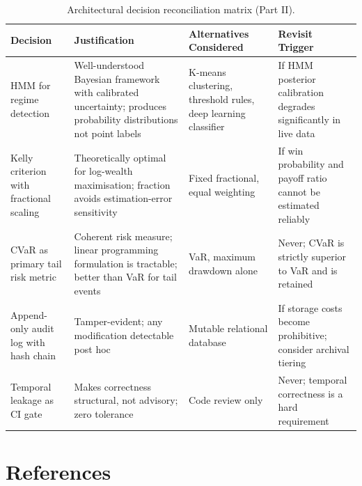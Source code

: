 \documentclass[12pt,openany]{book}
\numberwithin{equation}{chapter}
\theoremstyle{plain}
\theoremstyle{definition}
\theoremstyle{remark}
\begin{document}
\begin{table}[H]
\centering
\caption{Architectural decision reconciliation matrix (Part II).}
\label{tab:decisions_2}
\small
\begin{tabularx}{\textwidth}{p{3.5cm} p{4.5cm} p{3.5cm} p{3.0cm}}
\toprule
\textbf{Decision} & \textbf{Justification} & \textbf{Alternatives Considered} & \textbf{Revisit Trigger} \\
\midrule
HMM for regime detection &
    Well-understood Bayesian framework with calibrated uncertainty;
    produces probability distributions not point labels &
    K-means clustering, threshold rules, deep learning classifier &
    If HMM posterior calibration degrades significantly in live data \\
\midrule
Kelly criterion with fractional scaling &
    Theoretically optimal for log-wealth maximisation; fraction avoids
    estimation-error sensitivity &
    Fixed fractional, equal weighting &
    If win probability and payoff ratio cannot be estimated reliably \\
\midrule
CVaR as primary tail risk metric &
    Coherent risk measure; linear programming formulation is tractable;
    better than VaR for tail events &
    VaR, maximum drawdown alone &
    Never; CVaR is strictly superior to VaR and is retained \\
\midrule
Append-only audit log with hash chain &
    Tamper-evident; any modification detectable post hoc &
    Mutable relational database &
    If storage costs become prohibitive; consider archival tiering \\
\midrule
Temporal leakage as CI gate &
    Makes correctness structural, not advisory; zero tolerance &
    Code review only &
    Never; temporal correctness is a hard requirement \\
\bottomrule
\end{tabularx}
\end{table}



\chapter*{References}
\end{document}

